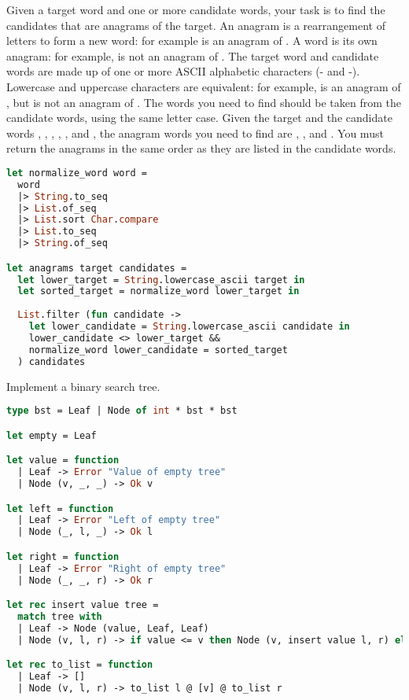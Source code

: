 Given a target word and one or more candidate words, your task is to find the candidates that are anagrams of the target.
An anagram is a rearrangement of letters to form a new word: for example  is an anagram of .
A word is  its own anagram: for example,  is not an anagram of .
The target word and candidate words are made up of one or more ASCII alphabetic characters (- and -).
Lowercase and uppercase characters are equivalent: for example,  is an anagram of , but  is not an anagram of .
The words you need to find should be taken from the candidate words, using the same letter case.
Given the target  and the candidate words , , , , , and , the anagram words you need to find are , , and .
You must return the anagrams in the same order as they are listed in the candidate words.

\begin{lstlisting}[language=OCaml]
let normalize_word word =
  word
  |> String.to_seq
  |> List.of_seq
  |> List.sort Char.compare
  |> List.to_seq
  |> String.of_seq

let anagrams target candidates =
  let lower_target = String.lowercase_ascii target in
  let sorted_target = normalize_word lower_target in
  
  List.filter (fun candidate ->
    let lower_candidate = String.lowercase_ascii candidate in
    lower_candidate <> lower_target && 
    normalize_word lower_candidate = sorted_target
  ) candidates
\end{lstlisting}

Implement a binary search tree.

\begin{lstlisting}[language=OCaml]
type bst = Leaf | Node of int * bst * bst

let empty = Leaf

let value = function
  | Leaf -> Error "Value of empty tree"
  | Node (v, _, _) -> Ok v

let left = function
  | Leaf -> Error "Left of empty tree"
  | Node (_, l, _) -> Ok l

let right = function
  | Leaf -> Error "Right of empty tree"
  | Node (_, _, r) -> Ok r

let rec insert value tree =
  match tree with
  | Leaf -> Node (value, Leaf, Leaf)
  | Node (v, l, r) -> if value <= v then Node (v, insert value l, r) else Node (v, l, insert value r)

let rec to_list = function
  | Leaf -> []
  | Node (v, l, r) -> to_list l @ [v] @ to_list r
\end{lstlisting}


